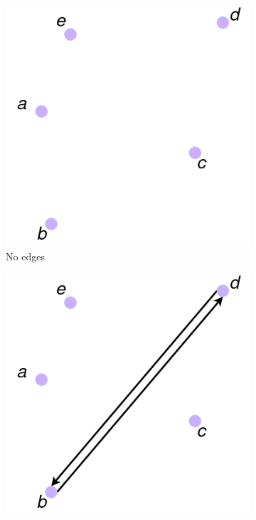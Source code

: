 \begin{figure}
	\centering
	\begin{subfigure}[b]{0.3\textwidth}
		\includegraphics[width=\textwidth]{images/extra_1}
		\caption{No edges}
	\end{subfigure}
	\hfill
	\begin{subfigure}[b]{0.3\textwidth}
		\includegraphics[width=\textwidth]{images/extra_2}

\end{subfigure}
\end{figure}
